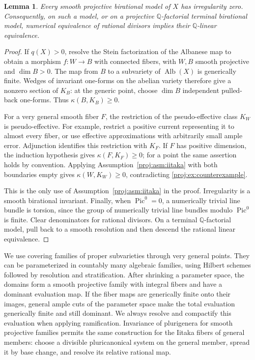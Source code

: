 \documentclass[11pt,letterpaper]{article}
\newcommand{\Q}{\mathbb{Q}}
\DeclareMathOperator{\Pic}{Pic}
\DeclareMathOperator{\Alb}{Alb}
\newtheorem{lemma}[theorem]{Lemma}
\theoremstyle{definition}
\theoremstyle{remark}
\begin{document}
\begin{lemma}\label{proj:ex:irregularity}
Every smooth projective birational model of \(X\) has irregularity zero.
Consequently, on such a model, or on a projective \(\Q\)-factorial
terminal birational model, numerical equivalence of rational divisors
implies their \(\Q\)-linear equivalence.
\end{lemma}
\begin{proof}
If \(q(X)>0\), resolve the Stein factorization of the Albanese map to
obtain a morphism \(f:W\to B\) with connected fibers, with \(W,B\)
smooth projective and \(\dim B>0\). The map from \(B\) to a subvariety
of \(\Alb(X)\) is generically finite. Wedges of invariant one-forms
on the abelian variety therefore give a nonzero section of \(K_B\):
at the generic point, choose \(\dim B\) independent pulled-back
one-forms. Thus \(\kappa(B,K_B)\geq0\).

For a very general smooth fiber \(F\), the restriction of the
pseudo-effective class \(K_W\) is pseudo-effective. For example, restrict
a positive current representing it to almost every fiber, or use
effective approximations with arbitrarily small ample error.
Adjunction identifies this restriction with \(K_F\). If \(F\) has
positive dimension, the induction hypothesis gives
\(\kappa(F,K_F)\geq0\); for a point the same assertion holds by
convention. Applying Assumption~\ref{proj:asm:iitaka} with both boundaries
empty gives \(\kappa(W,K_W)\geq0\), contradicting
\eqref{proj:ex:counterexample}.

This is the only use of Assumption~\ref{proj:asm:iitaka} in the proof.
Irregularity is a smooth birational invariant. Finally, when
\(\Pic^0=0\), a numerically trivial line bundle is torsion, since the
group of numerically trivial line bundles modulo \(\Pic^0\) is
finite. Clear denominators for rational divisors. On a terminal
\(\Q\)-factorial model, pull back to a smooth resolution and then
descend the rational linear equivalence.
\end{proof}

We use covering families of proper subvarieties through very general
points. They can be parameterized in countably many algebraic
families, using Hilbert schemes followed by resolution and
stratification. After shrinking a parameter space, the domains form
a smooth projective family with integral fibers and have a dominant
evaluation map. If the fiber maps are generically finite onto their
images, general ample cuts of the parameter space make the total
evaluation generically finite and still dominant. We always resolve
and compactify this evaluation when applying ramification.
Invariance of plurigenera for smooth projective families
\cite[Theorem~1]{Proj-Paun2007} permits the same construction for the
Iitaka fibers of general members: choose a divisible pluricanonical
system on the general member, spread it by base change, and resolve
its relative rational map.
\end{document}
